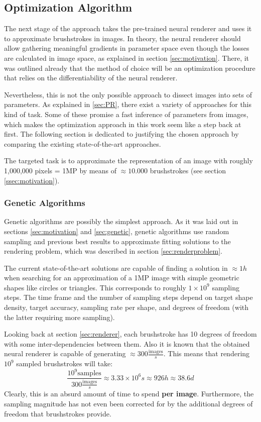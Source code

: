 \subsection{Optimization Algorithm}
The next stage of the approach takes the pre-trained neural renderer and uses it to approximate brushstrokes in images.
In theory, the neural renderer should allow gathering meaningful gradients in parameter space even though the losses are calculated in image space, as explained in section
\ref{sec:motivation}.
There, it was outlined already that the method of choice will be an optimization procedure that relies on the differentiability of the neural renderer.

Nevertheless, this is not the only possible approach to dissect images into sets of parameters.
As explained in \ref{sec:PR}, there exist a variety of approaches for this kind of task.
Some of these promise a fast inference of parameters from images, which makes the optimization approach in this work seem like a step back at first.
The following section is dedicated to justifying the chosen approach by comparing the existing state-of-the-art approaches.

The targeted task is to approximate the representation of an image with roughly 1,000,000 pixels =  1MP by means of $\approx 10.000$ brushstrokes (see section \ref{ssec:motivation}).

\subsubsection{Genetic Algorithms}
Genetic algorithms are possibly the simplest approach.
As it was laid out in sections \ref{sec:motivation} and \ref{sec:genetic}, genetic algorithms use random sampling and previous best results to approximate fitting solutions to the rendering problem, which was described in section \ref{sec:renderproblem}.

The current state-of-the-art solutions are capable of finding a solution in $\approx 1h$ when searching for an approximation of a 1MP image with simple geometric shapes like circles or triangles.
This corresponds to roughly $1 \times 10^{9}$ sampling steps.
The time frame and the number of sampling steps depend on target shape density, target accuracy, sampling rate per shape, and degrees of freedom (with the latter requiring more sampling).

Looking back at section \ref{sec:renderer}, each brushstroke has 10 degrees of freedom with some inter-dependencies between them.
Also it is known that the obtained neural renderer is capable of generating $\approx 300 \frac{\text{images}}{s}$.
This means that rendering $10^{9}$ sampled brushstrokes will take:
$$
\frac{10^{9} \text{samples}}{300 \frac{\text{images}}{s}} \approx 3.33 \times 10^{6} s
\approx 926 h \approx 38.6 d
$$
Clearly, this is an absurd amount of time to spend \textbf{per image}.
Furthermore, the sampling magnitude has not even been corrected for by the additional degrees of freedom that brushstrokes provide.

